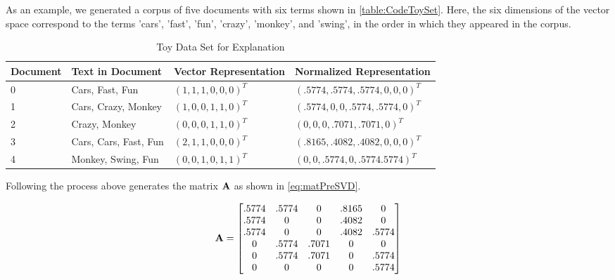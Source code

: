 As an example, we generated a corpus of five documents with six terms shown in \autoref{table:CodeToySet}. Here, the six dimensions of the vector space correspond to the terms 'cars', 'fast', 'fun', 'crazy', 'monkey', and 'swing', in the order in which they appeared in the corpus.

\begin{center}
\begin{table}[h]\label{table:1}
\begin{tabular}{| l | l | l | l |}
\hline
\textbf{Document} & \textbf{Text in Document} & \textbf{Vector Representation} & \textbf{Normalized Representation} \\ \hline
0        & Cars, Fast, Fun             & \((1, 1, 1, 0, 0, 0)^T\) & \((.5774, .5774, .5774, 0, 0, 0)^T\) \\ \hline
1        & Cars, Crazy, Monkey         & \((1, 0, 0, 1, 1, 0)^T\) & \((.5774, 0, 0, .5774, .5774, 0)^T\) \\ \hline
2        & Crazy, Monkey               & \((0, 0, 0, 1, 1, 0)^T\) & \((0, 0, 0, .7071, .7071, 0)^T\) \\ \hline
3        & Cars, Cars, Fast, Fun       & \((2, 1, 1, 0, 0, 0)^T\) & \((.8165, .4082, .4082, 0, 0, 0)^T\) \\ \hline
4        & Monkey, Swing, Fun          & \((0, 0, 1, 0, 1, 1)^T\) & \((0, 0, .5774, 0, .5774 .5774)^T\) \\ \hline
\end{tabular}
\caption{Toy Data Set for Explanation}
\label{table:CodeToySet}
\vspace{-12mm}
\end{table}
\end{center}

Following the process above generates the matrix $\operatorname{\mathbf{A}}$ as shown in \autoref{eq:matPreSVD}.

\begin{equation}\label{eq:matPreSVD}
\operatorname{\mathbf{A}}=
    \begin{bmatrix}
    .5774 & .5774 & 0 & .8165 & 0 \\
    .5774 & 0 & 0 & .4082 & 0 \\
    .5774 & 0 & 0 & .4082 & .5774 \\
    0     & .5774 & .7071 & 0 & 0 \\
    0     & .5774 & .7071 & 0 & .5774 \\
    0     & 0 & 0 & 0 & .5774 \\
    \end{bmatrix}
\end{equation}

